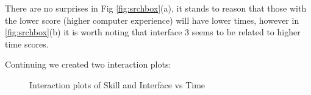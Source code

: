 \documentclass{article}
\begin{document}
	There are no surprises in Fig \ref{fig:srchbox}(a), it stands to reason that those with the lower score (higher computer experience) will have lower times, however in \ref{fig:srchbox}(b) it is worth noting that interface 3 seems to be related to higher time scores.
	
	Continuing we created two interaction plots:
	\begin{figure}[H]
	\centering
          \caption{Interaction plots of Skill and Interface vs Time}
          \label{fig:srch_interaction}
	\end{figure}
	
\end{document}
